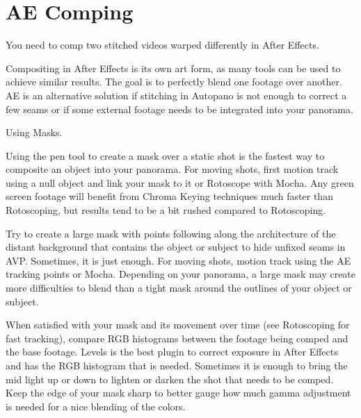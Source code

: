 \chapter{AE Comping}
\pagecolor{white}
\label{chap:51}
\begin{fullwidth}

\problem

{\large You need to comp two stitched videos warped differently in After Effects. \par}

Compositing in After Effects is its own art form, as many tools can be used to achieve similar results. The goal is to perfectly blend one footage over another. AE is an alternative solution if stitching in Autopano is not enough to correct a few seams or if some external footage needs to be integrated into your panorama.  

\solution

{\large Using Masks. \par}

Using the pen tool to create a mask over a static shot is the fastest way to composite an object into your panorama. For moving shots, first motion track using a null object and link your mask to it or Rotoscope with Mocha. Any green screen footage will benefit from Chroma Keying techniques much faster than Rotoscoping, but results tend to be a bit rushed compared to Rotoscoping.


Try to create a large mask with points following along the architecture of the distant background that contains the object or subject to hide unfixed seams in AVP. Sometimes, it is just enough. For moving shots, motion track using the AE tracking points or Mocha. Depending on your panorama, a large mask may create more difficulties to blend than a tight mask around the outlines of your object or subject. 


When satisfied with your mask and its movement over time (see Rotoscoping for fast tracking), compare RGB histograms between the footage being comped and the base footage. Levels is the best plugin to correct exposure in After Effects and has the RGB histogram that is needed. Sometimes it is enough to bring the mid light up or down to lighten or darken the shot that needs to be comped. Keep the edge of your mask sharp to better gauge how much gamma adjustment is needed for a nice blending of the colors.


\end{fullwidth}
